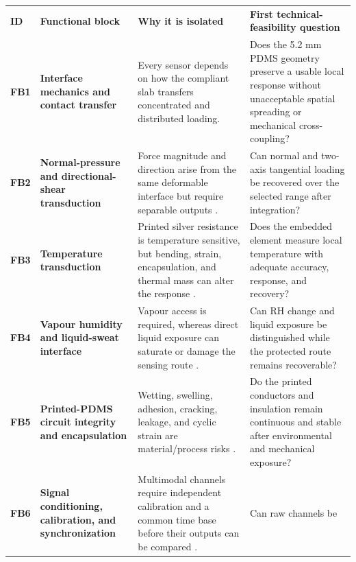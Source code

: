 \vspace{0.45em}
\begingroup
\fontsize{7.8}{9.15}\selectfont
\setlength{\tabcolsep}{2.5pt}
\renewcommand{\arraystretch}{1.12}
\begin{tabularx}{\linewidth}{>{\centering\arraybackslash\bfseries\color{AUBRed}}p{0.72cm}
                            >{\raggedright\arraybackslash\bfseries}p{3.25cm}
                            Y
                            >{\raggedright\arraybackslash}p{4.45cm}}
\color{white}\textbf{ID} & \color{white}\textbf{Functional block} &
\color{white}\textbf{Why it is isolated} &
\color{white}\textbf{First technical-feasibility question} \\
FB1 & Interface mechanics and contact transfer & Every sensor depends on how
the compliant slab transfers concentrated and distributed loading. & Does the
5.2 mm PDMS geometry preserve a usable local response without unacceptable
spatial spreading or mechanical cross-coupling? \\
FB2 & Normal-pressure and directional-shear transduction & Force magnitude and
direction arise from the same deformable interface but require separable
outputs \cite{albrecht2019}. & Can normal and two-axis tangential loading be
recovered over the selected range after integration? \\
FB3 & Temperature transduction & Printed silver resistance is temperature
sensitive, but bending, strain, encapsulation, and thermal mass can alter the
response \cite{liew2020,q3kwak2020}. & Does the embedded element measure local
temperature with adequate accuracy, response, and recovery? \\
FB4 & Vapour humidity and liquid-sweat interface & Vapour access is required,
whereas direct liquid exposure can saturate or damage the sensing route
\cite{aitmammar2020,paterno2020}. & Can RH change and liquid exposure be
distinguished while the protected route remains recoverable? \\
FB5 & Printed-PDMS circuit integrity and encapsulation & Wetting, swelling,
adhesion, cracking, leakage, and cyclic strain are material/process risks
\cite{albrecht2018stretch,sun2016}. & Do the printed conductors and insulation
remain continuous and stable after environmental and mechanical exposure? \\
FB6 & Signal conditioning, calibration, and synchronization & Multimodal
channels require independent calibration and a common time base before their
outputs can be compared \cite{q3tang2022,q3kwak2020}. & Can raw channels be

\end{tabularx}
